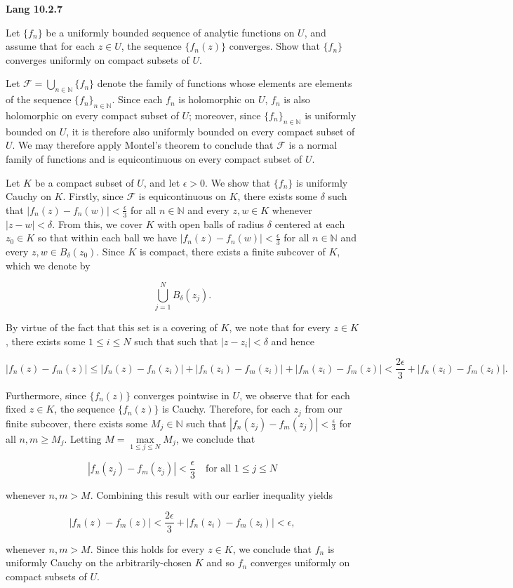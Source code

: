 \textbf{Lang 10.2.7}

Let $\{f_n\}$ be a uniformly bounded sequence of analytic functions on $U$, and assume that for each $z \in U$, the 
sequence $\{f_n(z)\}$ converges. Show that $\{f_n\}$ converges uniformly on compact subsets of $U$.

\begin{solution}
  Let $\mathcal{F} = \bigcup_{n \in \mathbb{N}}\{f_n\}$ denote the family of functions whose elements are elements of 
  the sequence $\{f_n\}_{n \in \mathbb{N}}$. Since each $f_n$ is holomorphic on $U$, $f_n$ is also holomorphic on every 
  compact subset of $U$; moreover, since $\{f_n\}_{n \in \mathbb{N}}$ is uniformly bounded on $U$, it is therefore also 
  uniformly bounded on every compact subset of $U$. We may therefore apply Montel's theorem to conclude that 
  $\mathcal{F}$ is a normal family of functions and is equicontinuous on every compact subset of $U$.

  Let $K$ be a compact subset of $U$, and let $\epsilon > 0$. We show that $\{f_n\}$ is uniformly Cauchy on $K$. 
  Firstly, since $\mathcal{F}$ is equicontinuous on $K$, there exists some $\delta$ such that 
  $|f_n(z) - f_n(w)| < \frac{\epsilon}{3}$ for all $n \in \mathbb{N}$ and every $z, w \in K$ whenever 
  $|z - w| < \delta$. From this, we cover $K$ with open balls of radius $\delta$ centered at each $z_0 \in K$ so that 
  within each ball we have $|f_n(z) - f_n(w)| < \frac{\epsilon}{3}$ for all $n \in \mathbb{N}$ and every 
  $z, w \in B_{\delta}(z_0)$. Since $K$ is compact, there exists a finite subcover of $K$, which we denote by

  $$
    \bigcup\limits_{j = 1}^{N} B_{\delta}(z_j).
  $$

  By virtue of the fact that this set is a covering of $K$, we note that for every $z \in K$, there exists some 
  $1 \le i \le N$ such that such that $|z - z_i| < \delta$ and hence

  $$
    |f_n(z) - f_m(z)| \le |f_n(z) - f_n(z_i)| + |f_n(z_i) - f_m(z_i)| + |f_m(z_i) - f_m(z)| 
                      < \frac{2 \epsilon}{3} + |f_n(z_i) - f_m(z_i)|.
  $$

  Furthermore, since $\{f_n(z)\}$ converges pointwise in $U$, we observe that for each fixed $z \in K$, the sequence 
  $\{f_n(z)\}$ is Cauchy. Therefore, for each $z_j$ from our finite subcover, there exists some $M_j \in \mathbb{N}$ 
  such that $|f_n(z_j) - f_m(z_j)| < \frac{\epsilon}{3}$ for all $n, m \ge M_j$. Letting 
  $M = \max\limits_{1 \le j \le N}{M_j}$, we conclude that

  $$
    |f_n(z_j) - f_m(z_j)| < \frac{\epsilon}{3} \quad \text{for all } 1 \le j \le N
  $$

  whenever $n, m > M$. Combining this result with our earlier inequality yields

  $$
    |f_n(z) - f_m(z)| < \frac{2 \epsilon}{3} + |f_n(z_i) - f_m(z_i)| < \epsilon,
  $$

  whenever $n, m > M$. Since this holds for every $z \in K$, we conclude that $f_n$ is uniformly Cauchy on the 
  arbitrarily-chosen $K$ and so $f_n$ converges uniformly on compact subsets of $U$.
  \ \\
\end{solution}
